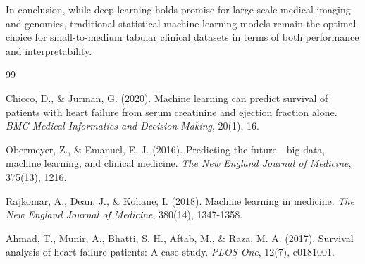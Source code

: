 \documentclass[12pt, a4paper]{article}
\begin{document}
In conclusion, while deep learning holds promise for large-scale medical imaging and genomics, traditional statistical machine learning models remain the optimal choice for small-to-medium tabular clinical datasets in terms of both performance and interpretability.

\begin{thebibliography}{99}

Chicco, D., \& Jurman, G. (2020). Machine learning can predict survival of patients with heart failure from serum creatinine and ejection fraction alone. \textit{BMC Medical Informatics and Decision Making}, 20(1), 16.

Obermeyer, Z., \& Emanuel, E. J. (2016). Predicting the future—big data, machine learning, and clinical medicine. \textit{The New England Journal of Medicine}, 375(13), 1216.

Rajkomar, A., Dean, J., \& Kohane, I. (2018). Machine learning in medicine. \textit{The New England Journal of Medicine}, 380(14), 1347-1358.

Ahmad, T., Munir, A., Bhatti, S. H., Aftab, M., \& Raza, M. A. (2017). Survival analysis of heart failure patients: A case study. \textit{PLOS One}, 12(7), e0181001.

\end{thebibliography}
\end{document}
